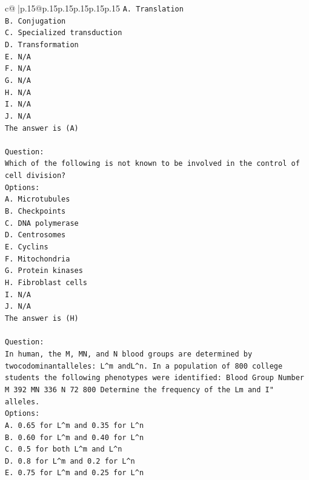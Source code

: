 \documentclass{article}
\begin{document}
{\begin{supertabular}{c@{$\;$}|p{.15\linewidth}@{}p{.15\linewidth}p{.15\linewidth}p{.15\linewidth}p{.15\linewidth}p{.15\linewidth}}
{{{\texttt{A. Translation} \\
\texttt{B. Conjugation} \\
\texttt{C. Specialized transduction} \\
\texttt{D. Transformation} \\
\texttt{E. N/A} \\
\texttt{F. N/A} \\
\texttt{G. N/A} \\
\texttt{H. N/A} \\
\texttt{I. N/A} \\
\texttt{J. N/A} \\
\texttt{The answer is (A)} \\
\\ 
\texttt{Question:} \\
\texttt{Which of the following is not known to be involved in the control of cell division?} \\
\texttt{Options:} \\
\texttt{A. Microtubules} \\
\texttt{B. Checkpoints} \\
\texttt{C. DNA polymerase} \\
\texttt{D. Centrosomes} \\
\texttt{E. Cyclins} \\
\texttt{F. Mitochondria} \\
\texttt{G. Protein kinases} \\
\texttt{H. Fibroblast cells} \\
\texttt{I. N/A} \\
\texttt{J. N/A} \\
\texttt{The answer is (H)} \\
\\ 
\texttt{Question:} \\
\texttt{In human, the M, MN, and N blood groups are determined by twocodominantalleles: L\^{}m andL\^{}n. In a population of 800 college students the following phenotypes were identified: Blood Group Number M 392 MN 336 N 72 800 Determine the frequency of the Lm and I" alleles.} \\
\texttt{Options:} \\
\texttt{A. 0.65 for L\^{}m and 0.35 for L\^{}n} \\
\texttt{B. 0.60 for L\^{}m and 0.40 for L\^{}n} \\
\texttt{C. 0.5 for both L\^{}m and L\^{}n} \\
\texttt{D. 0.8 for L\^{}m and 0.2 for L\^{}n} \\
\texttt{E. 0.75 for L\^{}m and 0.25 for L\^{}n} \\
}}}
\end{supertabular}}
\end{document}
